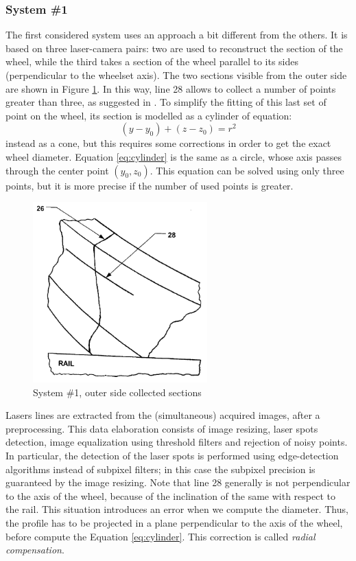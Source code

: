 \subsubsection{System \#1} %
The first considered system uses an approach a bit different from the others. It is based on three laser-camera pairs: two are used to reconstruct the section of the wheel, while the third takes a section of the wheel parallel to its sides (perpendicular to the wheelset axis). The two sections visible from the outer side are shown in Figure \ref{fig:cmp-sys1}. In this way, line 28 allows to collect a number of points greater than three, as suggested in \cite{wpms-giuseppe}. To simplify the fitting of this last set of point on the wheel, its section is modelled as a cylinder of equation:
  \begin{equation}
    \left( y - y_0 \right) + \left( z - z_0 \right) = r^2
    \label{eq:cylinder}
  \end{equation}
instead as a cone, but this requires some corrections in order to get the exact wheel diameter. Equation \ref{eq:cylinder} is the same as a circle, whose axis passes through the center point $\left( y_0, z_0 \right)$. This equation can be solved using only three points, but it is more precise if the number of used points is greater.
  \begin{figure}[t!]
    \centering
    \includegraphics[width=0.6\textwidth]{./images/wpms/lasers1.png}
    \caption{System \#1, outer side collected sections}
    \label{fig:cmp-sys1}
  \end{figure}
Lasers lines are extracted from the (simultaneous) acquired images, after a preprocessing. This data elaboration consists of image resizing, laser spots detection, image equalization using threshold filters and rejection of noisy points. In particular, the detection of the laser spots is performed using edge-detection algorithms instead of subpixel filters; in this case the subpixel precision is guaranteed by the image resizing. Note that line 28 generally is not perpendicular to the axis of the wheel, because of the inclination of the same with respect to the rail. This situation introduces an error when we compute the diameter. Thus, the profile has to be projected in a plane perpendicular to the axis of the wheel, before compute the Equation \ref{eq:cylinder}. This correction is called \textit{radial compensation}. \\
